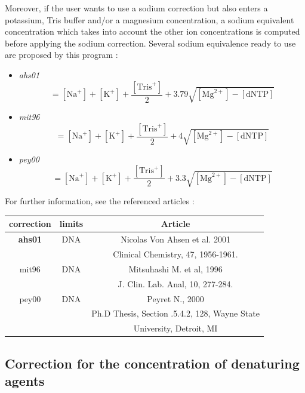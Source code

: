 \documentclass{article}
\begin{document}
Moreover, if the user wants to use a sodium correction but also enters a potassium, Tris buffer
and/or a magnesium concentration, a sodium equivalent concentration which takes into account the other
ion concentrations is computed before applying the sodium correction.
Several sodium equivalence ready to use are proposed by this program :
\begin{itemize}
\item \textit{ahs01}
 \begin{displaymath}
 [\mbox{NaEq}^+]=[\mbox{Na}^+]+[\mbox{K}^+]+\frac{[\mbox{Tris}^+]}{2}+3.79 \sqrt{[\mbox{Mg}^{2+}] - [\mbox{dNTP}]}
 \end{displaymath}
 \item \textit{mit96}
 \begin{displaymath}
 [\mbox{NaEq}^+]=[\mbox{Na}^+]+[\mbox{K}^+]+\frac{[\mbox{Tris}^+]}{2}+4 \sqrt{[\mbox{Mg}^{2+}] - [\mbox{dNTP}]}
 \end{displaymath}
 \item \textit{pey00}
 \begin{displaymath}
 [\mbox{NaEq}^+]=[\mbox{Na}^+]+[\mbox{K}^+]+\frac{[\mbox{Tris}^+]}{2}+3.3 \sqrt{[\mbox{Mg}^{2+}] - [\mbox{dNTP}]}
 \end{displaymath}
\end{itemize}

For further information, see the referenced articles :
\begin{table}[hc]
\begin{tabular}[h]{| c | c | c |}
\textbf{correction} & \textbf{limits} & \textbf{Article} \\
\hline 
\textbf{ahs01} & DNA & Nicolas Von Ahsen et al. 2001 \\
 & & Clinical Chemistry, 47, 1956-1961. \\
\hline
mit96 & DNA & Mitsuhashi M. et al, 1996 \\
 & & J. Clin. Lab. Anal, 10, 277-284.\\
\hline
pey00 & DNA & Peyret N., 2000 \\
 & & Ph.D Thesis, Section .5.4.2, 128, Wayne State \\
 & & University, Detroit, MI\\
 \hline
\end{tabular}
\end{table}

\subsection{Correction for the concentration of denaturing agents}  
\end{document}
